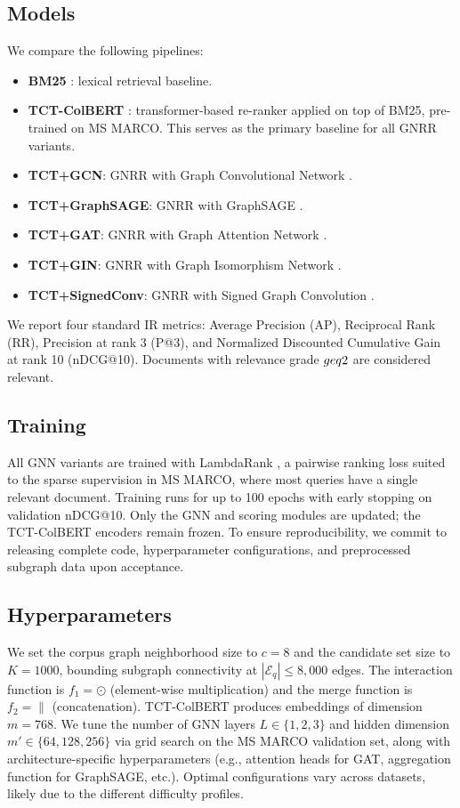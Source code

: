 \documentclass[runningheads]{llncs}
\newcommand{\ModelName}{\textsc{GNRR}\xspace}
\begin{document}
\subsection{Models}
We compare the following pipelines:
\begin{itemize}
    \item \textbf{BM25} \cite{bm25}: lexical retrieval baseline.
    \item \textbf{TCT-ColBERT} \cite{tctcolbert}: transformer-based re-ranker applied on top of BM25, pre-trained on MS MARCO. This serves as the primary baseline for all \ModelName variants.
    \item \textbf{TCT+GCN}: \ModelName with Graph Convolutional Network \cite{GCN}.
    \item \textbf{TCT+GraphSAGE}: \ModelName with GraphSAGE \cite{GraphSAGE}.
    \item \textbf{TCT+GAT}: \ModelName with Graph Attention Network \cite{GAT}.
    \item \textbf{TCT+GIN}: \ModelName with Graph Isomorphism Network \cite{GIN}.
    \item \textbf{TCT+SignedConv}: \ModelName with Signed Graph Convolution \cite{signedconv}.
\end{itemize}
We report four standard IR metrics: Average Precision (AP), Reciprocal Rank (RR), Precision at rank 3 (P@3), and Normalized Discounted Cumulative Gain at rank 10 (nDCG@10). Documents with relevance grade $\\geq 2$ are considered relevant.

\subsection{Training}
All GNN variants are trained with LambdaRank \cite{lambdarank}, a pairwise ranking loss suited to the sparse supervision in MS MARCO, where most queries have a single relevant document. Training runs for up to 100 epochs with early stopping on validation nDCG@10. Only the GNN and scoring modules are updated; the TCT-ColBERT encoders remain frozen. To ensure reproducibility, we commit to releasing complete code, hyperparameter configurations, and preprocessed subgraph data upon acceptance.

\subsection{Hyperparameters}
We set the corpus graph neighborhood size to $c = 8$ and the candidate set size to $K = 1000$, bounding subgraph connectivity at $|\mathcal{E}_q| \leq 8{,}000$ edges. The interaction function is $f_1 = \odot$ (element-wise multiplication) and the merge function is $f_2 = \|$ (concatenation). TCT-ColBERT produces embeddings of dimension $m = 768$. We tune the number of GNN layers $L \in \{1, 2, 3\}$ and hidden dimension $m' \in \{64, 128, 256\}$ via grid search on the MS MARCO validation set, along with architecture-specific hyperparameters (e.g., attention heads for GAT, aggregation function for GraphSAGE, etc.). Optimal configurations vary across datasets, likely due to the different difficulty profiles.
\end{document}
